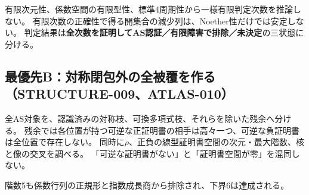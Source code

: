 \documentclass[11pt,a4paper]{ltjsarticle}
\begin{document}
有限次元性、係数空間の有限型性、標準4周期性から一様有限判定次数を推論しない。
有限次数の正確性で得る開集合の減少列は、Noether性だけでは安定しない。
判定結果は\textbf{全次数を証明してAS認証／有限障害で排除／未決定}の三状態に分ける。

\subsection{最優先B：対称閉包外の全被覆を作る（STRUCTURE-009、ATLAS-010）}
全AS対象を、認識済みの対称枝、可換多項式枝、それらを除いた残余へ分ける。
残余では各位置が持つ可逆な正証明書の相手は高々一つ、可逆な負証明書は全位置で存在しない。
同時に$\rho$、正負の線型証明書空間の次元・最大階数、核と像の交叉を調べる。
「可逆な証明書がない」と「証明書空間が零」を混同しない。

階数5も係数行列の正規形と指数成長商から排除され、下界6は達成される。
\end{document}
